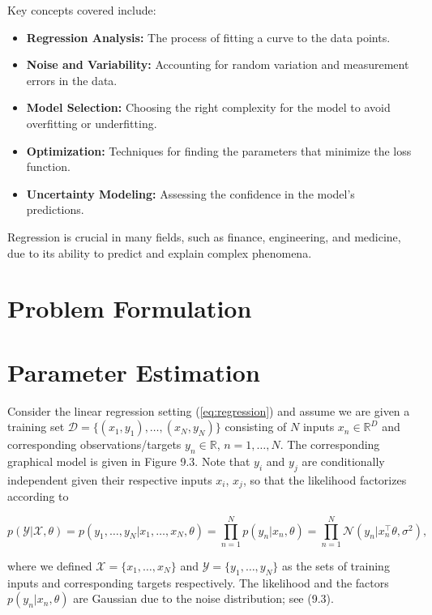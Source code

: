 \documentclass[12pt,openany]{book}
\theoremstyle{definition}
\begin{document}
	Key concepts covered include:
	
	\begin{itemize}
		\item \textbf{Regression Analysis:} The process of fitting a curve to the data points.
		\item \textbf{Noise and Variability:} Accounting for random variation and measurement errors in the data.
		\item \textbf{Model Selection:} Choosing the right complexity for the model to avoid overfitting or underfitting.
		\item \textbf{Optimization:} Techniques for finding the parameters that minimize the loss function.
		\item \textbf{Uncertainty Modeling:} Assessing the confidence in the model's predictions.
	\end{itemize}
	
	Regression is crucial in many fields, such as finance, engineering, and medicine, due to its ability to predict and explain complex phenomena.
	
	\section{Problem Formulation}
	
	\section{Parameter Estimation}
	
	Consider the linear regression setting (\ref{eq:regression}) and assume we are given a training set \( \mathcal{D} = \{ (x_1, y_1), \dots, (x_N, y_N) \} \) consisting of \( N \) inputs \( x_n \in \mathbb{R}^D \) and corresponding observations/targets \( y_n \in \mathbb{R} \), \( n = 1, \dots, N \). The corresponding graphical model is given in Figure 9.3. Note that \( y_i \) and \( y_j \) are conditionally independent given their respective inputs \( x_i \), \( x_j \), so that the likelihood factorizes according to
	
	\begin{equation}
		p(\mathcal{Y} | \mathcal{X}, \theta) = p(y_1, \dots, y_N | x_1, \dots, x_N, \theta) = \prod_{n=1}^{N} p(y_n | x_n, \theta) = \prod_{n=1}^{N} \mathcal{N}(y_n | x_n^\top \theta, \sigma^2), \tag{9.5a}
	\end{equation}
	
	where we defined \( \mathcal{X} = \{ x_1, \dots, x_N \} \) and \( \mathcal{Y} = \{ y_1, \dots, y_N \} \) as the sets of training inputs and corresponding targets respectively. The likelihood and the factors \( p(y_n | x_n, \theta) \) are Gaussian due to the noise distribution; see (9.3).
	
\end{document}
